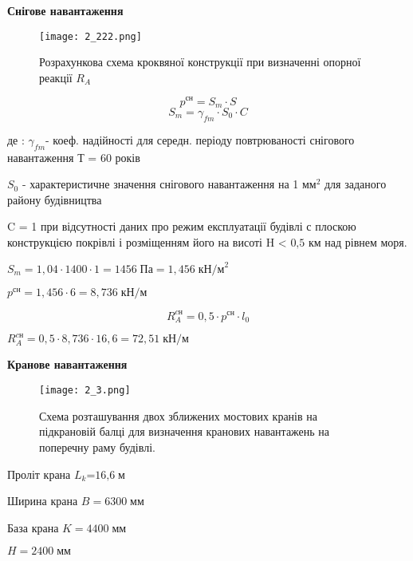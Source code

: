 \documentclass[a4paper,14pt]{article}
\begin{document}
\textbf{Снігове навантаження}
\begin{figure}[h!]
    \begin{center}
        \texttt{[image: 2\_222.png]}
        \caption{Розрахункова схема кроквяної конструкції при визначенні
        опорної реакції $R_A$}\label{ris2_222} 
    \end{center}
\end{figure}
\begin{equation}
    p^{\textit{сн}}=S_{\textit{m}}\cdot S
\end{equation}
\begin{equation}
    S_m=\gamma_{fm}\cdot S_0 \cdot C
\end{equation}

де : $\gamma_{fm}$- коеф. надійності для середн. періоду повтрюваності снігового навантаження Т = 60 років 

$S_0$ - характеристичне значення снігового навантаження на 1 м$м^{\textit{2}}$ для заданого району будівництва

C = 1 при відсутності даних про режим експлуатації будівлі с плоскою конструкцією покрівлі і розміщенням його на висоті H < ${\textit{0,5}}$ км над рівнем моря.

$S_m=1,04\cdot 1400\cdot 1=1456\;\textit{Па}=1,456\;{\textit{кН/м}}^2$

$p^{\textit{сн}}=1,456\cdot 6=8,736\;\textit{кН/м}$

\begin{equation}
    R^{\textit{cн}}_A=0,5\cdot p^{\textit{сн}}\cdot l_0
\end{equation}

$R^{\textit{cн}}_A=0,5\cdot 8,736 \cdot 16,6 = 72,51\;\textit{кН/м}$

\textbf{Кранове навантаження}
\begin{figure}[h]
    \begin{center}
        \texttt{[image: 2\_3.png]}
        \caption{Схема розташування двох зближених мостових кранів на
        підкрановій балці для визначення кранових навантажень на поперечну раму
        будівлі.}\label{ris2_3} 
    \end{center}
\end{figure}

Проліт крана $L_k$=$\textit{16,6}\;\textit{м}$

Ширина крана $B=6300\;\textit{мм}$

База крана $K=4400\;\textit{мм}$

$H=2400\;\textit{мм}$
\end{document}
